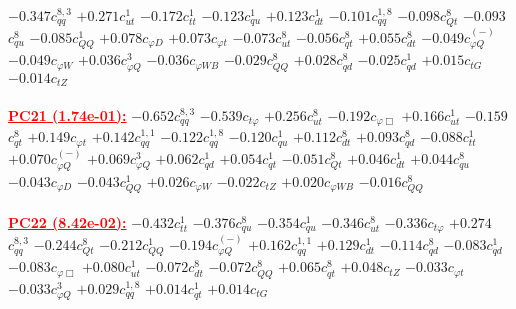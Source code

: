 \documentclass{article}
\begin{document}
{$-0.347$}{\rm $c_{qq}^{8,3}$}
{$+0.271$}{\rm $c_{ut}^{1}$}
{$-0.172$}{\rm $c_{tt}^{1}$}
{$-0.123$}{\rm $c_{qu}^{1}$}
{$+0.123$}{\rm $c_{dt}^{1}$}
{$-0.101$}{\rm $c_{qq}^{1,8}$}
{$-0.098$}{\rm $c_{Qt}^{8}$}
{$-0.093$}{\rm $c_{qu}^{8}$}
{$-0.085$}{\rm $c_{QQ}^{1}$}
{$+0.078$}{\rm $c_{\varphi D}$}
{$+0.073$}{\rm $c_{\varphi t}$}
{$-0.073$}{\rm $c_{ut}^{8}$}
{$-0.056$}{\rm $c_{qt}^{8}$}
{$+0.055$}{\rm $c_{dt}^{8}$}
{$-0.049$}{\rm $c_{\varphi Q}^{(-)}$}
{$-0.049$}{\rm $c_{\varphi W}$}
{$+0.036$}{\rm $c_{\varphi Q}^{3}$}
{$-0.036$}{\rm $c_{\varphi WB}$}
{$-0.029$}{\rm $c_{QQ}^{8}$}
{$+0.028$}{\rm $c_{qd}^{8}$}
{$-0.025$}{\rm $c_{qd}^{1}$}
{$+0.015$}{\rm $c_{tG}$}
{$-0.014$}{\rm $c_{tZ}$}
 \nonumber \\ \nonumber \\
\noindent \textcolor{red}{\underline{\bf{PC21} (1.74e-01):}}
{$-0.652$}{\rm $c_{qq}^{8,3}$}
{$-0.539$}{\rm $c_{t \varphi}$}
{$+0.256$}{\rm $c_{ut}^{8}$}
{$-0.192$}{\rm $c_{\varphi \Box}$}
{$+0.166$}{\rm $c_{ut}^{1}$}
{$-0.159$}{\rm $c_{qt}^{8}$}
{$+0.149$}{\rm $c_{\varphi t}$}
{$+0.142$}{\rm $c_{qq}^{1,1}$}
{$-0.122$}{\rm $c_{qq}^{1,8}$}
{$-0.120$}{\rm $c_{qu}^{1}$}
{$+0.112$}{\rm $c_{dt}^{8}$}
{$+0.093$}{\rm $c_{qd}^{8}$}
{$-0.088$}{\rm $c_{tt}^{1}$}
{$+0.070$}{\rm $c_{\varphi Q}^{(-)}$}
{$+0.069$}{\rm $c_{\varphi Q}^{3}$}
{$+0.062$}{\rm $c_{qd}^{1}$}
{$+0.054$}{\rm $c_{qt}^{1}$}
{$-0.051$}{\rm $c_{Qt}^{8}$}
{$+0.046$}{\rm $c_{dt}^{1}$}
{$+0.044$}{\rm $c_{qu}^{8}$}
{$-0.043$}{\rm $c_{\varphi D}$}
{$-0.043$}{\rm $c_{QQ}^{1}$}
{$+0.026$}{\rm $c_{\varphi W}$}
{$-0.022$}{\rm $c_{tZ}$}
{$+0.020$}{\rm $c_{\varphi WB}$}
{$-0.016$}{\rm $c_{QQ}^{8}$}
 \nonumber \\ \nonumber \\
\noindent \textcolor{red}{\underline{\bf{PC22} (8.42e-02):}}
{$-0.432$}{\rm $c_{tt}^{1}$}
{$-0.376$}{\rm $c_{qu}^{8}$}
{$-0.354$}{\rm $c_{qu}^{1}$}
{$-0.346$}{\rm $c_{ut}^{8}$}
{$-0.336$}{\rm $c_{t \varphi}$}
{$+0.274$}{\rm $c_{qq}^{8,3}$}
{$-0.244$}{\rm $c_{Qt}^{8}$}
{$-0.212$}{\rm $c_{QQ}^{1}$}
{$-0.194$}{\rm $c_{\varphi Q}^{(-)}$}
{$+0.162$}{\rm $c_{qq}^{1,1}$}
{$+0.129$}{\rm $c_{dt}^{1}$}
{$-0.114$}{\rm $c_{qd}^{8}$}
{$-0.083$}{\rm $c_{qd}^{1}$}
{$-0.083$}{\rm $c_{\varphi \Box}$}
{$+0.080$}{\rm $c_{ut}^{1}$}
{$-0.072$}{\rm $c_{dt}^{8}$}
{$-0.072$}{\rm $c_{QQ}^{8}$}
{$+0.065$}{\rm $c_{qt}^{8}$}
{$+0.048$}{\rm $c_{tZ}$}
{$-0.033$}{\rm $c_{\varphi t}$}
{$-0.033$}{\rm $c_{\varphi Q}^{3}$}
{$+0.029$}{\rm $c_{qq}^{1,8}$}
{$+0.014$}{\rm $c_{qt}^{1}$}
{$+0.014$}{\rm $c_{tG}$}
 \nonumber \\ \nonumber \\
\end{document}
